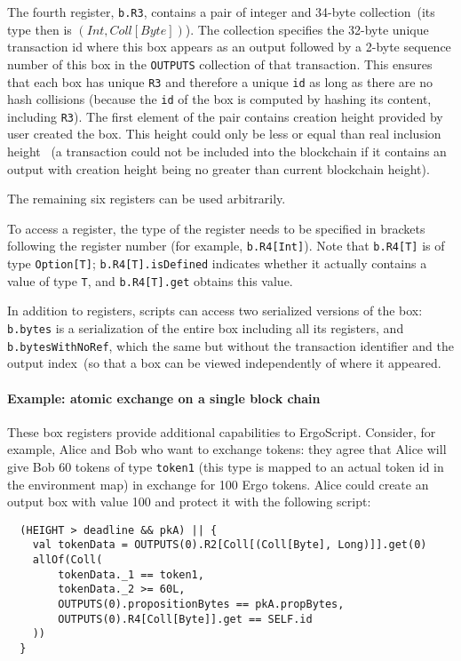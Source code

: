 \documentclass[11pt]{article}
\newcommand{\langname}{ErgoScript\xspace}
\begin{document}
The fourth register, \texttt{b.R3}, contains a pair of integer and 34-byte collection~(its type then is $(Int, Coll[Byte])$). The collection specifies the 32-byte unique transaction id where this box appears as an output followed by a 2-byte sequence number of this box in the \texttt{OUTPUTS} collection of that transaction. This ensures that each box has unique \texttt{R3} and therefore a unique \texttt{id} as long as there are no hash collisions (because the \texttt{id} of the box is computed by hashing its content, including \texttt{R3}).
The first element of the pair contains creation height provided by user created the box. This height could only be less or equal than real inclusion height~
(a transaction could not be included into the blockchain if it contains an output with creation height being no greater than current blockchain height).

The remaining six registers can be used arbitrarily.

To access a register, the type of the register needs to be specified in brackets following the register number (for example, \texttt{b.R4[Int]}). Note that \texttt{b.R4[T]} is of type \texttt{Option[T]}; \texttt{b.R4[T].isDefined} indicates whether it actually contains a value of type \texttt{T}, and \texttt{b.R4[T].get} obtains this value.

In addition to registers, scripts can access two serialized versions of the box: \texttt{b.bytes} is a serialization of the entire box including all its registers, and \texttt{b.bytesWithNoRef}, which the same but without the transaction identifier and the output index~(so that a box can be viewed independently of where it appeared.

\paragraph{Example: atomic exchange on a single block chain}
These box registers provide additional capabilities to \langname. Consider, for example, Alice and Bob who want to exchange tokens: they agree that  Alice will give Bob 60 tokens of type \texttt{token1} (this type is mapped to an actual token id in the environment map) in exchange for 100 Ergo tokens. Alice could create an output box with value 100 and protect it with the following script:

\begin{verbatim}
  (HEIGHT > deadline && pkA) || {
    val tokenData = OUTPUTS(0).R2[Coll[(Coll[Byte], Long)]].get(0)
    allOf(Coll(
        tokenData._1 == token1,
        tokenData._2 >= 60L,
        OUTPUTS(0).propositionBytes == pkA.propBytes,
        OUTPUTS(0).R4[Coll[Byte]].get == SELF.id
    ))
  }
\end{verbatim}
\end{document}
